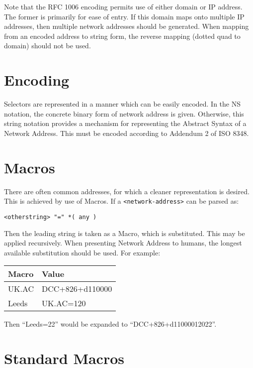Note that the RFC 1006 encoding permits use of either domain or IP address.
The former is primarily for ease of entry.  If this domain maps onto multiple IP
addresses, then multiple network addresses should be generated.  When
mapping from an encoded address to string form, the reverse mapping (dotted quad to domain)
should not be used.

\section {Encoding}

Selectors are represented in a manner which can be easily encoded.
In the NS notation, the concrete binary form of network address is given.
Otherwise, this string notation provides a mechanism for representing 
the Abstract 
Syntax of a Network Address.  This must be encoded according to Addendum 2
of ISO 8348.

\section {Macros}

There are often common addresses, for which a cleaner representation is
desired.  This is achieved by use of Macros.  If a \verb|<network-address>|
can be parsed
as:

\begin {verbatim}
<otherstring> "=" *( any )
\end{verbatim}

Then the leading string is taken as a Macro, which is substituted.  
This may be applied recursively.  When
presenting Network Address to humans, the longest available substitution
should be used. For example:

\begin {center}
\begin {tabular}{|l|l|}
\hline
Macro & Value \\
\hline
UK.AC & DCC+826+d110000 \\
Leeds & UK.AC=120 \\
\hline
\end {tabular}

\end {center}

Then ``Leeds=22'' would be expanded to ``DCC+826+d11000012022''.


\section {Standard Macros}

